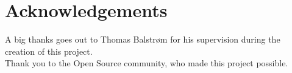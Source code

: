 


\begingroup

\let\clearpage\relax
\let\cleardoublepage\relax
\let\cleardoublepage\relax

\chapter*{Acknowledgements} %

\noindent A big thanks goes out to Thomas Balstrøm for his supervision during the creation of this project.\\

Thank you to the Open Source community, who made this project possible.

\bigskip

\endgroup